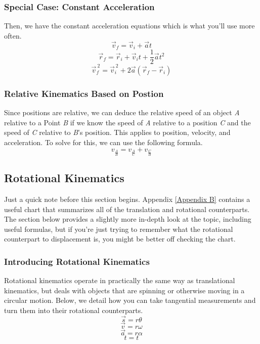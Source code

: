 \subsubsection{Special Case: Constant Acceleration} \label{kinematics const a}
Then, we have the constant acceleration equations which is what you'll use more often.
    \begin{equation}\label{eq: kinematic 1}
    \vec{v}_f = \vec{v}_i + \vec{a}t
\end{equation}
\begin{equation}\label{eq: kinematic 2}
    \vec{r}_f = \vec{r}_i + \vec{v}_it+ \frac{1}{2}\vec{a}t^2 
\end{equation}
\begin{equation}\label{eq: kinematic 3}
    \vec{v}_f^{ \: 2} = \vec{v}_i^{ \: 2} + 2 \vec{a} (\vec{r}_f - \vec{r}_i)
\end{equation}
\subsubsection{Relative Kinematics Based on Postion}
Since positions are relative, we can deduce the relative speed of an object \textit{A} relative to a Point \textit{B} if we know the speed of \textit{A} 
relative to a position \textit{C} and the speed of \textit{C} relative to \textit{B}'s position. This applies to position, velocity, and acceleration. 
To solve for this, we can use the following formula.
\begin{equation}
    v_{\frac{A}{B}} = v_{\frac{A}{C}} +  v_{\frac{C}{B}}
\end{equation}

\subsection{Rotational Kinematics}
Just a quick note before this section begins. Appendix \ref{Appendix B} contains a useful chart that summarizes all of the translation and rotational 
counterparts. The section below provides a slightly more in-depth look at the topic, including useful formulas, but if you're just trying to remember 
what the rotational counterpart to displacement is, you might be better off checking the chart.

\subsubsection{Introducing Rotational Kinematics} \label{trans to ang}
Rotational kinematics operate in practically the same way as translational kinematics, but deals with objects that are spinning or otherwise 
moving in a circular motion.
Below, we detail how you can take tangential measurements and turn them into their rotational counterparts. \\
\[ \vec{s} = r \theta \]
\[ \vec{v} = r \omega \]
\[ \vec{a} = r \alpha \]
\[ t = t \]

